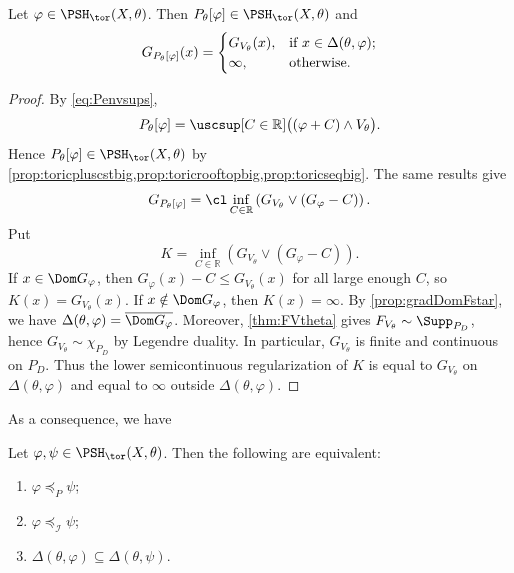 \begin{proposition}\label{prop:GPenvelopebig}
    Let $\varphi\in \PSH_{\tor}(X,\theta)$. Then $P_{\theta}[\varphi]\in \PSH_{\tor}(X,\theta)$ and
    \begin{equation}\label{eq:toricPenvbig}
    G_{P_{\theta}[\varphi]}(x)=
    \begin{cases}
        G_{V_{\theta}}(x),&\textup{if } x\in \Delta(\theta,\varphi);\\
        \infty,&\textup{otherwise}.
    \end{cases}
    \end{equation}
\end{proposition}
\begin{proof}
    By \eqref{eq:Penvsups},
    \[
    P_{\theta}[\varphi]=\uscsup[C\in \mathbb{R}]\bigl((\varphi+C)\land V_{\theta}\bigr).
    \]
    Hence $P_{\theta}[\varphi]\in \PSH_{\tor}(X,\theta)$ by \cref{prop:toricpluscstbig,prop:toricrooftopbig,prop:toricseqbig}. The same results give
    \[
    G_{P_{\theta}[\varphi]}=\cl\inf_{C\in \mathbb{R}}\left(G_{V_{\theta}}\lor (G_{\varphi}-C)\right).
    \]
    Put
    \[
    K=\inf_{C\in \mathbb{R}}\left(G_{V_{\theta}}\lor (G_{\varphi}-C)\right).
    \]
    If $x\in \Dom G_{\varphi}$, then $G_{\varphi}(x)-C\leq G_{V_{\theta}}(x)$ for all large enough $C$, so $K(x)=G_{V_{\theta}}(x)$. If $x\notin \Dom G_{\varphi}$, then $K(x)=\infty$. By \cref{prop:gradDomFstar}, we have $\Delta(\theta,\varphi)=\overline{\Dom G_{\varphi}}$. Moreover, \cref{thm:FVtheta} gives $F_{V_{\theta}}\sim \Supp_{P_D}$, hence $G_{V_{\theta}}\sim \chi_{P_D}$ by Legendre duality. In particular, $G_{V_{\theta}}$ is finite and continuous on $P_D$. Thus the lower semicontinuous regularization of $K$ is equal to $G_{V_{\theta}}$ on $\Delta(\theta,\varphi)$ and equal to $\infty$ outside $\Delta(\theta,\varphi)$.
\end{proof}
As a consequence, we have
\begin{corollary}\label{cor:PequivtorD}
    Let $\varphi,\psi\in \PSH_{\tor}(X,\theta)$. Then the following are equivalent:
    \begin{enumerate}
        \item\label{itm:cor:PequivtorD:1} $\varphi\preceq_P \psi$;
        \item\label{itm:cor:PequivtorD:2} $\varphi\preceq_{\mathcal{I}} \psi$;
        \item\label{itm:cor:PequivtorD:3} $\Delta(\theta,\varphi)\subseteq \Delta(\theta,\psi)$.
    \end{enumerate}
\end{corollary}
